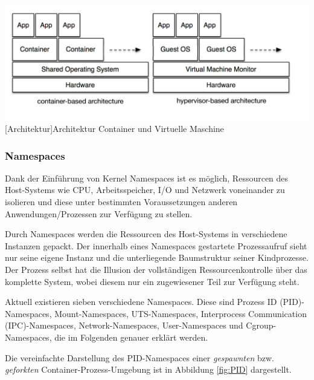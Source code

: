 \vspace{1em}
\begin{minipage}{\linewidth}
	\centering
	\includegraphics[width=1\linewidth]{pics/docker2.png}
	[Architektur]{Architektur Container und Virtuelle Maschine \cite{Xavier2015AClouds}}
	\label{fig:architecture}
\end{minipage}

\subsubsection{Namespaces}
Dank der Einführung von Kernel Namespaces ist es möglich, Ressourcen des Host-Systems wie CPU, Arbeitsspeicher, I/O und Netzwerk voneinander zu isolieren und diese unter bestimmten Voraussetzungen anderen Anwendungen/Prozessen zur Verfügung zu stellen. 

Durch Namespaces werden die Ressourcen des Host-Systems in verschiedene Instanzen gepackt. Der innerhalb eines Namespaces gestartete Prozessaufruf sieht nur seine eigene Instanz und die unterliegende Baumstruktur seiner Kindprozesse. Der Prozess selbst hat die Illusion der vollständigen Ressourcenkontrolle über das komplette System, wobei diesem nur ein zugewiesener Teil zur Verfügung steht.

Aktuell existieren sieben verschiedene Namespaces. Diese sind Prozess ID (PID)-Namespaces, Mount-Namespaces, UTS-Namespaces, Interprocess Communication (IPC)-Namespaces, Network-Namespaces, User-Namespaces und Cgroup-Namespaces, die im Folgenden genauer erklärt werden.

Die vereinfachte Darstellung des PID-Namespaces einer \emph{gespawnten} bzw. \emph{geforkten} Container-Prozess-Umgebung ist in Abbildung \ref{fig:PID} dargestellt. \cite{Liebel2017SkalierbareContainer-Infrastrukturen}

